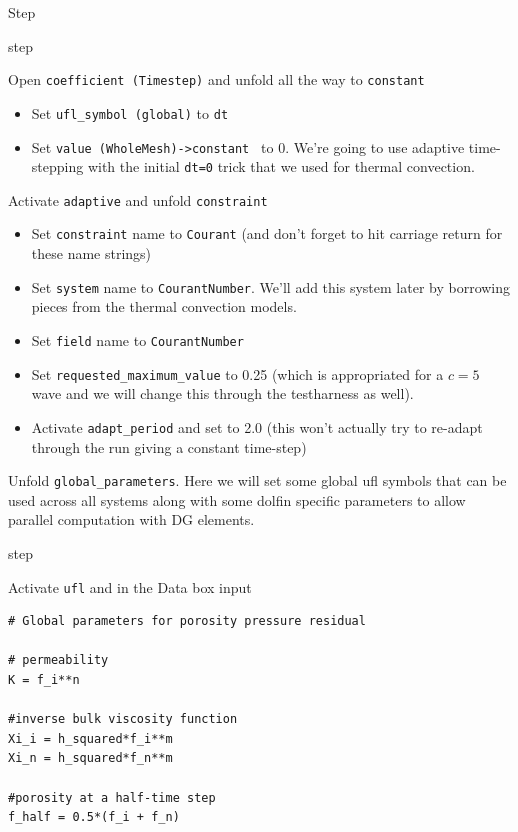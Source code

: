 \begin{steps}{Step}
\begin{steps}{step}
  \item Open \texttt{coefficient (Timestep)} and unfold all the way to \texttt{constant}
    \begin{itemize}
    \item Set \texttt{ufl\_symbol (global)} to \texttt{dt}
    \item Set \texttt{value (WholeMesh)->constant } to 0.  We're
      going to use adaptive time-stepping with the initial \texttt{dt=0} trick
      that we used for thermal convection.
    \end{itemize}
  \item Activate \texttt{adaptive} and unfold \texttt{constraint}
    \begin{itemize}
    \item Set \texttt{constraint} name to \texttt{Courant}
      (and don't forget to hit carriage return for these name strings)
    \item Set \texttt{system} name to \texttt{CourantNumber}.  We'll
      add this system later by borrowing pieces from the thermal
      convection models.
    \item Set  \texttt{field} name to \texttt{CourantNumber}
    \item Set \texttt{requested\_maximum\_value} to 0.25 (which is
      appropriated for a $c=5$ wave and we will change this through
      the testharness as well).
    \item Activate \texttt{adapt\_period} and set to 2.0 (this won't actually try
      to re-adapt through the run giving a constant time-step)      
    \end{itemize}
  \end{steps}
\item Unfold \texttt{global\_parameters}. Here we will set some global
  ufl symbols that can be used across all systems along with some
  dolfin specific parameters to allow parallel computation with DG elements.
  \begin{steps}{step}
  \item Activate \texttt{ufl} and in the Data box input
    \begin{lstlisting}[style=UFL]
# Global parameters for porosity pressure residual 

# permeability
K = f_i**n

#inverse bulk viscosity function
Xi_i = h_squared*f_i**m
Xi_n = h_squared*f_n**m

#porosity at a half-time step
f_half = 0.5*(f_i + f_n)


\end{lstlisting}
\end{steps}
\end{steps}
